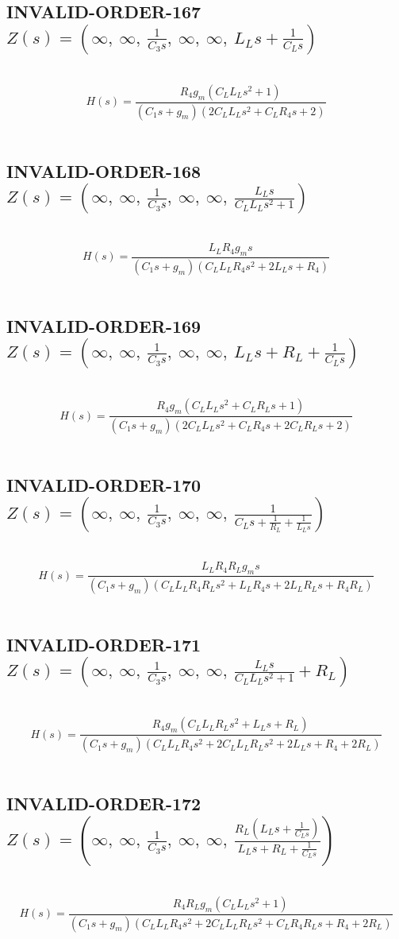 \documentclass{article}
\begin{document}
\subsection{INVALID-ORDER-167 $Z(s) = \left( \infty, \  \infty, \  \frac{1}{C_{3} s}, \  \infty, \  \infty, \  L_{L} s + \frac{1}{C_{L} s}\right)$ } \ 
\textbf{\[H(s) = \frac{R_{4} g_{m} \left(C_{L} L_{L} s^{2} + 1\right)}{\left(C_{1} s + g_{m}\right) \left(2 C_{L} L_{L} s^{2} + C_{L} R_{4} s + 2\right)}\] } \ 
\subsection{INVALID-ORDER-168 $Z(s) = \left( \infty, \  \infty, \  \frac{1}{C_{3} s}, \  \infty, \  \infty, \  \frac{L_{L} s}{C_{L} L_{L} s^{2} + 1}\right)$ } \ 
\textbf{\[H(s) = \frac{L_{L} R_{4} g_{m} s}{\left(C_{1} s + g_{m}\right) \left(C_{L} L_{L} R_{4} s^{2} + 2 L_{L} s + R_{4}\right)}\] } \ 
\subsection{INVALID-ORDER-169 $Z(s) = \left( \infty, \  \infty, \  \frac{1}{C_{3} s}, \  \infty, \  \infty, \  L_{L} s + R_{L} + \frac{1}{C_{L} s}\right)$ } \ 
\textbf{\[H(s) = \frac{R_{4} g_{m} \left(C_{L} L_{L} s^{2} + C_{L} R_{L} s + 1\right)}{\left(C_{1} s + g_{m}\right) \left(2 C_{L} L_{L} s^{2} + C_{L} R_{4} s + 2 C_{L} R_{L} s + 2\right)}\] } \ 
\subsection{INVALID-ORDER-170 $Z(s) = \left( \infty, \  \infty, \  \frac{1}{C_{3} s}, \  \infty, \  \infty, \  \frac{1}{C_{L} s + \frac{1}{R_{L}} + \frac{1}{L_{L} s}}\right)$ } \ 
\textbf{\[H(s) = \frac{L_{L} R_{4} R_{L} g_{m} s}{\left(C_{1} s + g_{m}\right) \left(C_{L} L_{L} R_{4} R_{L} s^{2} + L_{L} R_{4} s + 2 L_{L} R_{L} s + R_{4} R_{L}\right)}\] } \ 
\subsection{INVALID-ORDER-171 $Z(s) = \left( \infty, \  \infty, \  \frac{1}{C_{3} s}, \  \infty, \  \infty, \  \frac{L_{L} s}{C_{L} L_{L} s^{2} + 1} + R_{L}\right)$ } \ 
\textbf{\[H(s) = \frac{R_{4} g_{m} \left(C_{L} L_{L} R_{L} s^{2} + L_{L} s + R_{L}\right)}{\left(C_{1} s + g_{m}\right) \left(C_{L} L_{L} R_{4} s^{2} + 2 C_{L} L_{L} R_{L} s^{2} + 2 L_{L} s + R_{4} + 2 R_{L}\right)}\] } \ 
\subsection{INVALID-ORDER-172 $Z(s) = \left( \infty, \  \infty, \  \frac{1}{C_{3} s}, \  \infty, \  \infty, \  \frac{R_{L} \left(L_{L} s + \frac{1}{C_{L} s}\right)}{L_{L} s + R_{L} + \frac{1}{C_{L} s}}\right)$ } \ 
\textbf{\[H(s) = \frac{R_{4} R_{L} g_{m} \left(C_{L} L_{L} s^{2} + 1\right)}{\left(C_{1} s + g_{m}\right) \left(C_{L} L_{L} R_{4} s^{2} + 2 C_{L} L_{L} R_{L} s^{2} + C_{L} R_{4} R_{L} s + R_{4} + 2 R_{L}\right)}\] } \ 
\end{document}
